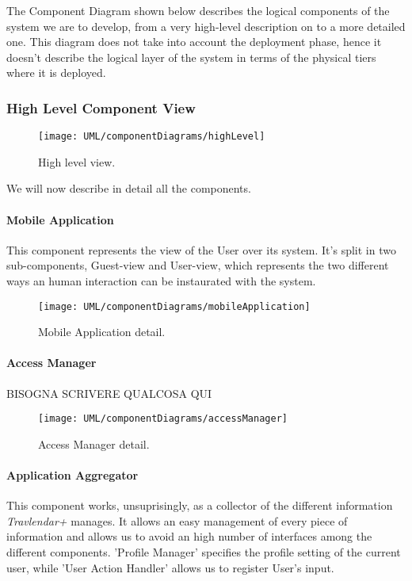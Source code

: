 The Component Diagram shown below describes the logical components of the system we are to develop, from a very high-level description on to a more detailed one. This diagram does not take into account the deployment phase, hence it doesn’t describe the logical layer of the system in terms of the physical tiers where it is deployed.

\subsubsection{High Level Component View}

	\begin{figure}[H]
			\centering
			\texttt{[image: UML/componentDiagrams/highLevel]}
			\caption{High level view.}
			\label{componentHighLevel}
		\end{figure}

	We will now describe in detail all the components.

	\paragraph{Mobile Application}
		This component represents the view of the User over its system. It’s split in two sub-components, Guest-view and User-view, which represents the two different ways an human interaction can be instaurated with the system.

		\begin{figure}[H]
			\centering
			\texttt{[image: UML/componentDiagrams/mobileApplication]}
			\caption{Mobile Application detail.}
			\label{mobileApplicationDetail}
		\end{figure}

	\paragraph{Access Manager}
	BISOGNA SCRIVERE QUALCOSA QUI
	
		\begin{figure}[H]
			\centering
			\texttt{[image: UML/componentDiagrams/accessManager]}
			\caption{Access Manager detail.}
			\label{accessManagerDetail}
		\end{figure}
		
		
	\paragraph{Application Aggregator}
		This component works, unsuprisingly, as a collector of the different information \textit{Travlendar+} manages. It allows an easy management of every piece of information and allows us to avoid an high number of interfaces among the different components. 'Profile Manager' specifies the profile setting of the current user, while 'User Action Handler' allows us to register User's input.
	
